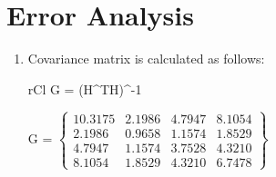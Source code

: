 \documentclass[conference,compsoc]{IEEEtran}
\begin{document}
 \section{Error Analysis}
 \begin{enumerate}
 	\item  Covariance matrix is calculated as follows:
 	\begin{IEEEeqnarray}{rCl}
 		G = (H^T\cdot H)^{-1}
 	\end{IEEEeqnarray}
 		G =    
 		$\begin{Bmatrix}
 			10.3175  &  2.1986 &   4.7947   & 8.1054\\
 			2.1986 &   0.9658  &  1.1574  &  1.8529\\
 			4.7947  &  1.1574   & 3.7528  &  4.3210\\
 			8.1054  &  1.8529 &   4.3210  &  6.7478
 		\end{Bmatrix}$\\
 	

\end{enumerate}
\end{document}
